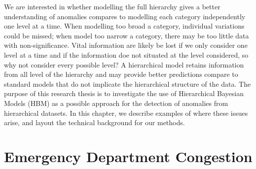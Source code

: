 
\newpara 

We are interested in whether modelling the full hierarchy gives a better understanding of anomalies compares to modelling each category independently one level at a time. When modelling too broad a category, individual variations could be missed; when model too narrow a category, there may be too little data with non-significance. Vital information are likely be lost if we only consider one level at a time and if the information doe not situated at the level considered, so why not consider every possible level? A hierarchical model retains information from all level of the hierarchy and may provide better predictions compare to standard models that do not implicate the hierarchical structure of the data. The purpose of this research thesis is to investigate the use of Hierarchical Bayesian Models (HBM) as a possible approach for the detection of anomalies from hierarchical datasets. In this chapter, we describe examples of where these issues arise, and layout the technical background for our methods. 


\section{Emergency Department Congestion}

